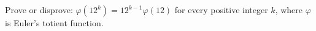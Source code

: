 Prove or disprove: $\varphi(12^k)=12^{k-1}\varphi(12)$ for every positive integer $k$, where $\varphi$ is Euler's totient function.
